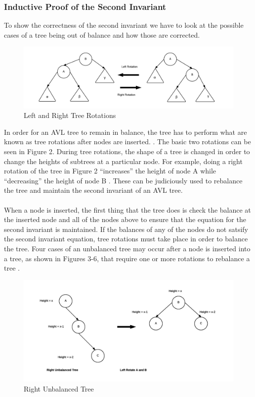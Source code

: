 \documentclass[12pt]{article}
\begin{document}
\subsubsection*{Inductive Proof of the Second Invariant}
To show the correctness of the second invariant we have to look at the possible
cases of a tree being out of balance and how those are corrected.
\begin{figure}[h]
\caption{Left and Right Tree Rotations}
\includegraphics[width=12cm]{tree_rotations.png}
\centering
\end{figure}
\noindent
In order for an AVL tree to remain in balance, the tree has to
perform what are known as tree rotations after nodes are inserted.
\cite{wiki:avl}.
The basic two rotations can be seen in Figure 2.  During tree rotations, the
shape of a tree is changed in order to change the heights of subtrees
at a particular node.  For example, doing a right rotation of the tree in
Figure 2 ``increases'' the height of node A while ``decreasing'' the height of
node B \cite{wiki:tree-rotations}.  These can be judiciously used to rebalance
the tree and maintain the second invariant of an AVL tree.\\
\\
When a node is inserted, the first thing that the tree does is check
the balance at the inserted node and all of the nodes above to
ensure that the equation for the second invariant is maintained.  If the
balances of any of the nodes do not satsify the second invariant equation, tree
rotations must take place in order to balance the tree.  
Four cases of an unbalanced tree may occur after a node is inserted into a tree,
as shown in Figures 3-6, that require one or more
rotations to rebalance a tree \cite{tutorialspoint:avl}.
\begin{figure}[h]
\caption{Right Unbalanced Tree}
\includegraphics[width=12cm]{right_unbalanced_tree.png}
\centering
\end{figure}
\end{document}
